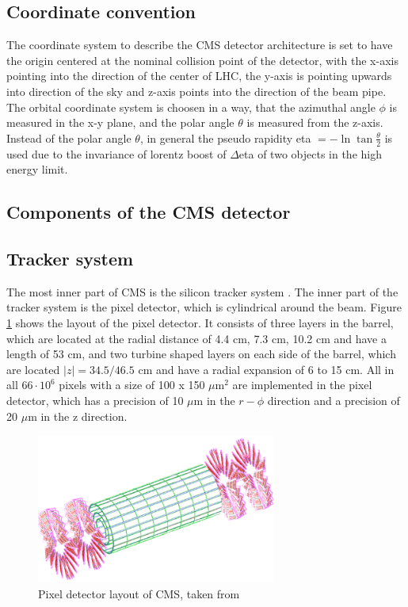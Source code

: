 \subsection{Coordinate convention}

The coordinate system to describe the \gls{CMS} detector architecture is set to have the origin centered at the nominal collision point of the detector, with the x-axis pointing into the direction of the center of \gls{LHC}, the y-axis is pointing upwards into direction of the sky and z-axis points into the direction of the beam pipe. The orbital coordinate system is choosen in a way, that the azimuthal angle $\phi$ is measured in the x-y plane, and the polar angle $\theta$ is measured from the z-axis. Instead of the polar angle $\theta$, in general the pseudo rapidity \gls{eta} $= -\ln{\tan{\frac{\theta}{2}}}$ is used due to the invariance of lorentz boost of $\Delta$\gls{eta} of two objects in the high energy limit.


\subsection{Components of the \gls{CMS} detector}
\label{sec:section_2_2_2}

\subsection*{Tracker system}

The most inner part of \gls{CMS} is the silicon tracker system \cite{CMS2, CMSTRACKER}. The inner part of the tracker system is the pixel detector, which is cylindrical around the beam. Figure \ref{fig:fig_2_6} shows the layout of the pixel detector. It consists of three layers in the barrel, which are located at the radial distance of 4.4 cm, 7.3 cm, 10.2 cm and have a length of 53 cm, and two turbine shaped layers on each side of the barrel, which are located $|z| = 34.5/46.5$ cm and have a radial expansion of 6 to 15 cm. All in all $66\cdot 10^{6}$ pixels with a size of 100 x 150 $\mu$m$^{2}$ are implemented in the pixel detector, which has a precision of 10 $\mu$m in the $r-\phi$ direction and a precision of 20 $\mu$m in the z direction. \\

\begin{figure}[ht]
	\centering
	\includegraphics[width=0.7\textwidth]{pictures/CMS_tracker.pdf}

	\caption[Pixel detector layout of CMS]{Pixel detector layout of CMS, taken from \cite{CMS2}}
	\label{fig:fig_2_6}
\end{figure}


